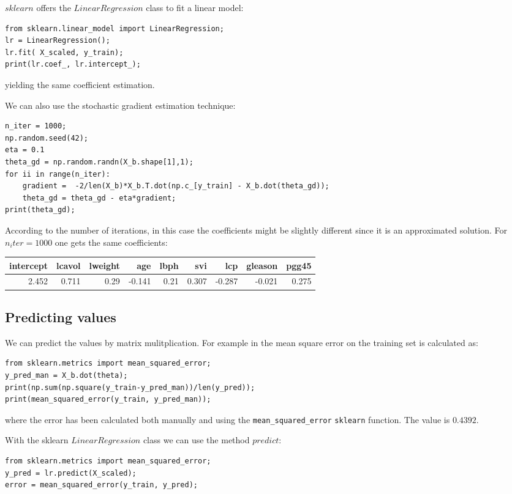 \documentclass[12pt, letterpaper]{article}
\theoremstyle{definition}
\begin{document}
$sklearn$ offers the $LinearRegression$ class to fit a linear model:
\begin{lstlisting}
from sklearn.linear_model import LinearRegression;
lr = LinearRegression();
lr.fit( X_scaled, y_train);
print(lr.coef_, lr.intercept_);
\end{lstlisting}
yielding the same coefficient estimation.

We can also use the stochastic gradient estimation technique:
\begin{lstlisting}
n_iter = 1000;
np.random.seed(42);
eta = 0.1
theta_gd = np.random.randn(X_b.shape[1],1);
for ii in range(n_iter):
    gradient =  -2/len(X_b)*X_b.T.dot(np.c_[y_train] - X_b.dot(theta_gd));
    theta_gd = theta_gd - eta*gradient;
print(theta_gd);
\end{lstlisting}
According to the number of iterations, in this case the coefficients might be slightly different since it is an approximated solution. For $n_iter=1000$ one gets the same coefficients:

\begin{tabular}{rrrrrrrrr}
\toprule
 intercept &  lcavol &  lweight &    age &  lbph &    svi &    lcp &  gleason &  pgg45 \\
\midrule
     2.452 &   0.711 &     0.29 & -0.141 &  0.21 &  0.307 & -0.287 &   -0.021 &  0.275 \\
\bottomrule
\end{tabular}


\subsection{Predicting values}
We can predict the values by matrix mulitplication. For example in the mean square error on the training set is calculated as:
\begin{lstlisting}
from sklearn.metrics import mean_squared_error;
y_pred_man = X_b.dot(theta);
print(np.sum(np.square(y_train-y_pred_man))/len(y_pred));
print(mean_squared_error(y_train, y_pred_man));
\end{lstlisting}
where the error has been calculated both manually and using the \lstinline+mean_+\lstinline+squared_+\lstinline+error+ \lstinline+sklearn+ function. The value is $0.4392$.

With the sklearn $LinearRegression$ class we can use the method $predict$:
\begin{lstlisting}
from sklearn.metrics import mean_squared_error;
y_pred = lr.predict(X_scaled);
error = mean_squared_error(y_train, y_pred);
\end{lstlisting}
\end{document}
